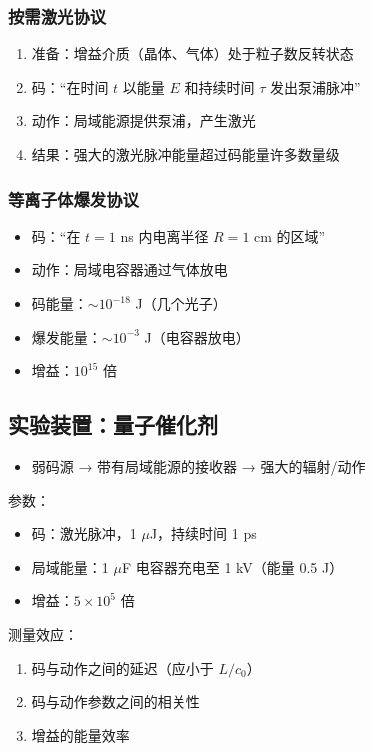 \documentclass[11pt,a4paper]{article}
\begin{document}
	\subsubsection{按需激光协议}
	\begin{enumerate}
		\item 准备：增益介质（晶体、气体）处于粒子数反转状态
		\item 码：“在时间 $t$ 以能量 $E$ 和持续时间 $\tau$ 发出泵浦脉冲”
		\item 动作：局域能源提供泵浦，产生激光
		\item 结果：强大的激光脉冲能量超过码能量许多数量级
	\end{enumerate}
	
	\subsubsection{等离子体爆发协议}
	\begin{itemize}
		\item 码：“在 $t=1$ ns 内电离半径 $R=1$ cm 的区域”
		\item 动作：局域电容器通过气体放电
		\item 码能量：$\sim 10^{-18}$ J（几个光子）
		\item 爆发能量：$\sim 10^{-3}$ J（电容器放电）
		\item 增益：$10^{15}$ 倍
	\end{itemize}
	
	\subsection{实验装置：量子催化剂}
	
	\begin{itemize}
		\item 弱码源 → 带有局域能源的接收器 → 强大的辐射/动作
	\end{itemize}
	
	参数：
	\begin{itemize}
		\item 码：激光脉冲，1 $\mu$J，持续时间 1 ps
		\item 局域能量：1 $\mu$F 电容器充电至 1 kV（能量 0.5 J）
		\item 增益：$5 \times 10^5$ 倍
	\end{itemize}
	
	测量效应：
	\begin{enumerate}
		\item 码与动作之间的延迟（应小于 $L/c_0$）
		\item 码与动作参数之间的相关性
		\item 增益的能量效率
	\end{enumerate}
	
\end{document}
